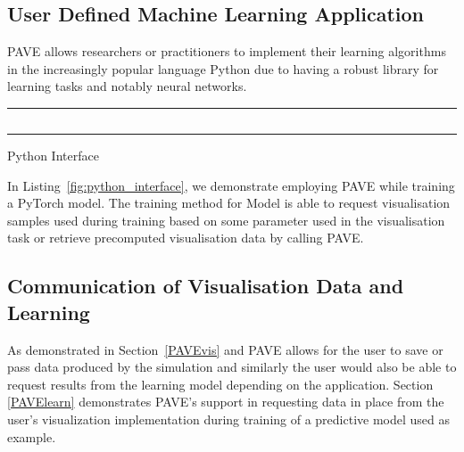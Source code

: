 \subsection{User Defined Machine Learning Application}

PAVE allows researchers or practitioners to implement their learning algorithms in the increasingly popular language Python due to having a robust library for learning tasks and notably neural networks. 

\begin{listing}[htb]
\noindent\rule{0.5\textwidth}{1pt}\label{PAVElearn}
\inputminted{python}{pave.py}
\noindent\rule{0.5\textwidth}{1pt}
\caption{Python Interface}
\label{fig:python_interface}
\end{listing}

In Listing~\ref{fig:python_interface}, we demonstrate employing PAVE while training a PyTorch model. The training method for Model is able to request visualisation samples used during training based on some parameter used in the visualisation task or retrieve precomputed visualisation data by calling PAVE.
 
\subsection{Communication of Visualisation Data and Learning}

As demonstrated in Section~\ref{PAVEvis} and PAVE allows for the user to save or pass data produced by the simulation and similarly the user would also be able to request results from the learning model depending on the application. Section \ref{PAVElearn} demonstrates PAVE's support in requesting data in place from the user's visualization implementation during training of a predictive model used as example. 
